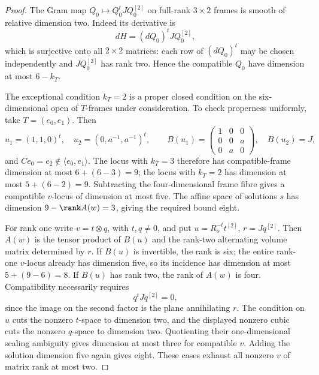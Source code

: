 \begin{proof}
The Gram map $Q_0\mapsto Q_0^tJQ_0^{[2]}$ on full-rank
$3\times2$ frames is smooth of relative dimension two.
Indeed its derivative is
\[
                     dH=(dQ_0)^tJQ_0^{[2]},
\]
which is surjective onto all $2\times2$ matrices: each row
of $(dQ_0)^t$ may be chosen independently and
$JQ_0^{[2]}$ has rank two. Hence the compatible $Q_0$ have
dimension at most $6-k_T$.

The exceptional condition $k_T=2$ is a proper closed condition
on the six-dimensional open of $T$-frames under consideration.
To check properness uniformly, take $T=(e_0,e_1)$. Then
\[
 u_1=(1,1,0)^t,\quad u_2=(0,a^{-1},a^{-1})^t,\qquad
 B(u_1)=\begin{pmatrix}1&0&0\\0&0&a\\0&a&0\end{pmatrix},
 \quad B(u_2)=J,
\]
and $Ce_0=e_2\notin\langle e_0,e_1\rangle$.
The locus with $k_T=3$ therefore has compatible-frame
dimension at most $6+(6-3)=9$; the locus with $k_T=2$ has
dimension at most $5+(6-2)=9$. Subtracting the four-dimensional
frame fibre gives a compatible $v$-locus of dimension at most
five. The affine space of solutions $s$ has dimension
$9-\rank A(w)=3$, giving the required bound eight.

For rank one write $v=t\otimes q$, with $t,q\ne0$, and put
$u=R_o^{-t}t^{[2]}$, $r=Jq^{[2]}$.
Then $A(w)$ is the tensor product of $B(u)$ and the
rank-two alternating volume matrix determined by $r$.
If $B(u)$ is invertible, the rank is six; the entire rank-one
$v$-locus already has dimension five, so its incidence has
dimension at most $5+(9-6)=8$.
If $B(u)$ has rank two, the rank of $A(w)$ is four.
Compatibility necessarily requires
\[
                             q^tJq^{[2]}=0,
\]
since the image on the second factor is the plane annihilating
$r$. The condition on $u$ cuts the nonzero $t$-space to
dimension two, and the displayed nonzero cubic cuts the
nonzero $q$-space to dimension two. Quotienting their
one-dimensional scaling ambiguity gives dimension at most
three for compatible $v$. Adding the solution dimension five
again gives eight. These cases exhaust all nonzero $v$ of
matrix rank at most two.
\end{proof}

